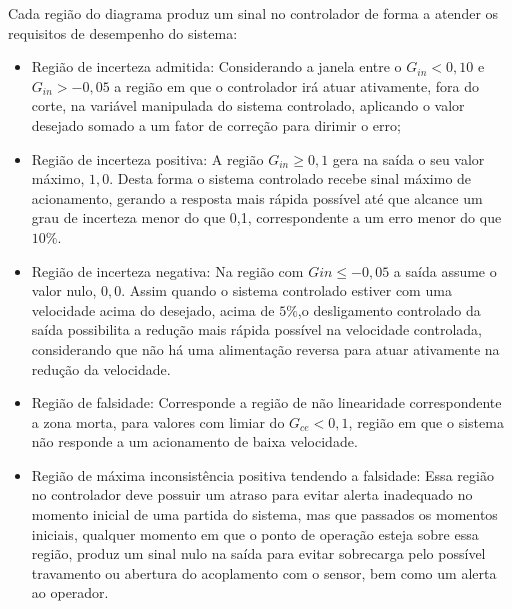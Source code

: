 Cada região do diagrama produz um sinal no controlador de forma a
atender os requisitos de desempenho do sistema:
\begin{itemize}

\item Região de incerteza admitida:
Considerando a janela entre o $G_{in} < 0,10$ e $G_{in} > -0,05$
a região em que o controlador irá atuar ativamente,
fora do corte, na variável manipulada do sistema controlado,
aplicando o valor desejado somado a um fator de correção para dirimir o erro;

\item Região de incerteza positiva:
A região $G_{in} \ge 0,1$ gera na saída o seu valor máximo, $1,0$.
Desta forma o sistema controlado recebe sinal máximo de
acionamento, gerando a resposta mais rápida possível até que alcance
um grau de incerteza menor do que 0,1, correspondente a um erro
menor do que $10\%$.

\item Região de incerteza negativa:
Na região com $Gin \le -0,05$ a saída assume o valor nulo, $0,0$.
Assim quando o sistema controlado estiver com
uma velocidade acima do desejado, acima de $5\%$,o desligamento
controlado da saída possibilita a redução mais rápida possível na
velocidade controlada, considerando que não há uma alimentação
reversa para atuar ativamente na redução da velocidade.

\item Região de falsidade:
Corresponde a região de não linearidade correspondente a zona morta,
para valores com limiar do $G_{ce} < 0,1$,
região em que o sistema não responde a um acionamento de baixa velocidade.

\item Região de máxima inconsistência positiva tendendo a falsidade:
Essa região no controlador deve possuir um atraso para evitar alerta inadequado
no momento inicial de uma partida do sistema,
mas que passados os momentos iniciais,
qualquer momento em que o ponto de operação esteja sobre essa região,
produz um sinal nulo na saída para evitar sobrecarga pelo possível travamento
ou abertura do acoplamento com o sensor,
bem como um alerta ao operador.

\end{itemize}



 






\newpage



































